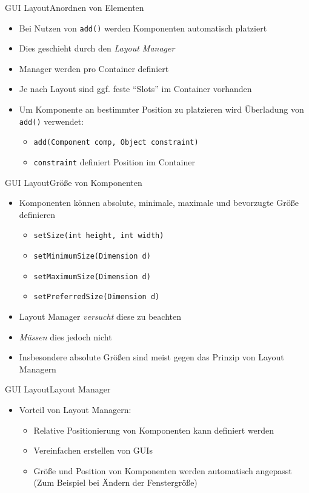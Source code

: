 \begin{frame}{GUI Layout}{Anordnen von Elementen}
    \begin{itemize}
        \item Bei Nutzen von \texttt{add()} werden Komponenten automatisch platziert
        \item Dies geschieht durch den \textit{Layout Manager}
        \item Manager werden pro Container definiert
        \item Je nach Layout sind ggf. feste "`Slots"' im Container vorhanden
        \item Um Komponente an bestimmter Position zu platzieren wird Überladung von \texttt{add()} verwendet:
        \begin{itemize}
            \item \texttt{add(Component comp, Object constraint)}
            \item \texttt{constraint} definiert Position im Container
        \end{itemize}
    \end{itemize}
\end{frame}

\begin{frame}{GUI Layout}{Größe von Komponenten}
    \begin{itemize}
        \item Komponenten können absolute, minimale, maximale und bevorzugte Größe definieren
        \begin{itemize}
            \item \texttt{setSize(int height, int width)}
            \item \texttt{setMinimumSize(Dimension d)}
            \item \texttt{setMaximumSize(Dimension d)}
            \item \texttt{setPreferredSize(Dimension d)}
        \end{itemize}
        \item Layout Manager \textit{versucht} diese zu beachten
        \item \textit{Müssen} dies jedoch nicht
        \item Insbesondere absolute Größen sind meist gegen das Prinzip von Layout Managern
    \end{itemize}
\end{frame}

\begin{frame}{GUI Layout}{Layout Manager}
    \begin{itemize}
        \item Vorteil von Layout Managern:
        \begin{itemize}
            \item Relative Positionierung von Komponenten kann definiert werden
            \item Vereinfachen erstellen von GUIs
            \item Größe und Position von Komponenten werden automatisch angepasst (Zum Beispiel bei Ändern der Fenstergröße)
        \end{itemize}
    \end{itemize}
\end{frame}

